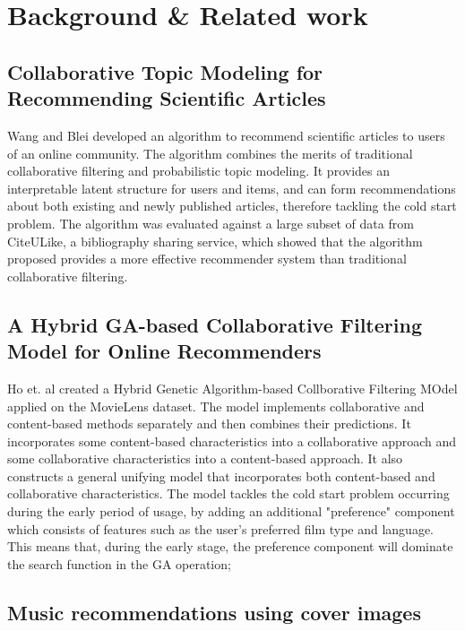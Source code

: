 \documentclass{article} %
\begin{document}
\section{Background \& Related work}

\subsection{Collaborative Topic Modeling for Recommending Scientific Articles}

Wang and Blei \cite{wang2011collaborative} developed an algorithm to recommend scientific articles to users of an online community. The algorithm combines the merits of traditional collaborative filtering and probabilistic topic modeling. It provides an interpretable latent structure for users and items, and can form recommendations about both existing and newly published articles, therefore tackling the cold start problem. The algorithm was evaluated against a large subset of data from CiteULike, a bibliography sharing service, which showed that the algorithm proposed provides a more effective recommender system than traditional collaborative filtering.

\subsection{A Hybrid GA-based Collaborative Filtering Model for Online Recommenders}

Ho et. al \cite{ho2007hybrid} created a Hybrid Genetic Algorithm-based Collborative Filtering MOdel applied on the MovieLens dataset. The model implements collaborative and content-based methods separately and then combines their predictions. It incorporates some content-based characteristics into a collaborative approach and some collaborative characteristics into a content-based approach. It also constructs a general unifying model that incorporates both content-based and collaborative characteristics. The model tackles the cold start problem occurring during the early period of usage, by adding an additional "preference" component which consists of features such as the user's preferred film type and language. This means that, during the early stage, the preference component will dominate the search function in the GA operation;

\subsection{Music recommendations using cover images}
\end{document}

